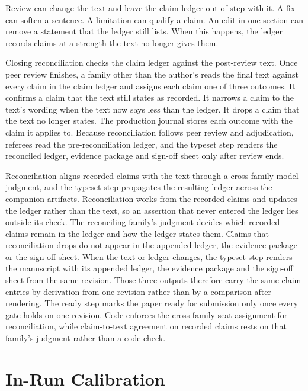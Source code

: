 \documentclass[
]{article}
\begin{document}
Review can change the text and leave the claim ledger out of step with
it. A fix can soften a sentence. A limitation can qualify a claim. An
edit in one section can remove a statement that the ledger still lists.
When this happens, the ledger records claims at a strength the text no
longer gives them.

Closing reconciliation checks the claim ledger against the post-review
text. Once peer review finishes, a family other than the author's reads
the final text against every claim in the claim ledger and assigns each
claim one of three outcomes. It confirms a claim that the text still
states as recorded. It narrows a claim to the text's wording when the
text now says less than the ledger. It drops a claim that the text no
longer states. The production journal stores each outcome with the claim
it applies to. Because reconciliation follows peer review and
adjudication, referees read the pre-reconciliation ledger, and the
typeset step renders the reconciled ledger, evidence package and
sign-off sheet only after review ends.

Reconciliation aligns recorded claims with the text through a
cross-family model judgment, and the typeset step propagates the
resulting ledger across the companion artifacts. Reconciliation works
from the recorded claims and updates the ledger rather than the text, so
an assertion that never entered the ledger lies outside its check. The
reconciling family's judgment decides which recorded claims remain in
the ledger and how the ledger states them. Claims that reconciliation
drops do not appear in the appended ledger, the evidence package or the
sign-off sheet. When the text or ledger changes, the typeset step
renders the manuscript with its appended ledger, the evidence package
and the sign-off sheet from the same revision. Those three outputs
therefore carry the same claim entries by derivation from one revision
rather than by a comparison after rendering. The ready step marks the
paper ready for submission only once every gate holds on one revision.
Code enforces the cross-family seat assignment for reconciliation, while
claim-to-text agreement on recorded claims rests on that family's
judgment rather than a code check.

\section{In-Run Calibration}\label{in-run-calibration}
\end{document}
